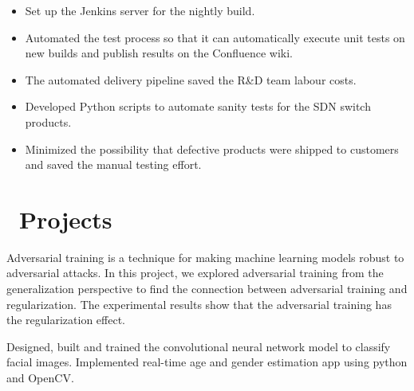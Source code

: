 \documentclass{resume}
\begin{document}
\begin{itemize}
	\item Set up the Jenkins server for the nightly build. 
	\item Automated the test process so that it can automatically execute unit tests on new builds and publish results on the Confluence wiki.
	\item The automated delivery pipeline saved the R\&D team labour costs.
\end{itemize}

\begin{itemize}
	\item Developed Python scripts to automate sanity tests for the SDN switch products.
	\item Minimized the possibility that defective products were shipped to customers and saved the manual testing effort.
\end{itemize}

\section{\faUsers\ Projects}
Adversarial training is a technique for making machine learning models robust to adversarial attacks. In this project, we explored adversarial training from the generalization perspective to find the connection between adversarial training and regularization. The experimental results show that the adversarial training has the regularization effect.

Designed, built and trained the convolutional neural network model to classify facial images. Implemented real-time age and gender estimation app using python and OpenCV.

%
%
\end{document}
